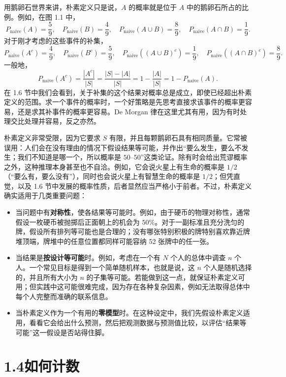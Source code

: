 \documentclass[UTF8,12pt,a4paper,fontset=fandol]{ctexart}
\begin{document}
用鹅卵石世界来讲，朴素定义只是说，$A$ 的概率就是位于 $A$ 中的鹅卵石所占的比例。例如，在图 1.1 中，
\[
  P_{\text{naive}}(A)=\frac59,\quad
  P_{\text{naive}}(B)=\frac49,\quad
  P_{\text{naive}}(A\cup B)=\frac89,\quad
  P_{\text{naive}}(A\cap B)=\frac19.
\]
对于刚才考虑的这些事件的补集，
\[
  P_{\text{naive}}(A^c)=\frac49,\quad
  P_{\text{naive}}(B^c)=\frac59,\quad
  P_{\text{naive}}((A\cup B)^c)=\frac19,\quad
  P_{\text{naive}}((A\cap B)^c)=\frac89.
\]
一般地，
\[
  P_{\text{naive}}(A^c)
  =\frac{|A^c|}{|S|}
  =\frac{|S|-|A|}{|S|}
  =1-\frac{|A|}{|S|}
  =1-P_{\text{naive}}(A).
\]
在 1.6 节中我们会看到，关于补集的这个结果对概率总是成立，即使已经超出朴素定义的范围。求一个事件的概率时，一个好策略是先思考直接求该事件的概率更容易，还是求其补事件的概率更容易。De Morgan 律在这里尤其有用，因为有时处理交比处理并容易，反之亦然。

朴素定义非常受限，因为它要求 $S$ 有限，并且每颗鹅卵石具有相同质量。它常被误用：人们会在没有理由的情况下假设结果等可能，并作出“要么发生，要么不发生；我们不知道是哪一个，所以概率是 $50$--$50$”这类论证。除有时会给出荒谬概率之外，这种推理本身甚至也不自洽。例如，它会说火星上有生命的概率是 $1/2$（“要么有，要么没有”），同时也会说火星上有智慧生命的概率是 $1/2$；但凭直觉，以及 1.6 节中发展的概率性质，后者显然应当严格小于前者。不过，朴素定义确实适用于几类重要问题：
\begin{itemize}
  \item 当问题中有\textbf{对称性}，使各结果等可能时。例如，由于硬币的物理对称性，通常假设一枚硬币被抛掷后正面朝上的机会为 $50\%$。对于一副标准且充分洗匀的牌，假设所有排列等可能也是合理的；没有哪张特别积极的牌特别喜欢靠近牌堆顶端，牌堆中的任意位置都同样可能容纳 52 张牌中的任一张。
  \item 当结果是\textbf{按设计等可能}时。例如，考虑在一个有 $N$ 个人的总体中调查 $n$ 个人。一个常见目标是得到一个简单随机样本，也就是说，这 $n$ 个人是随机选择的，并且所有大小为 $n$ 的子集等可能。若能做到这一点，就保证朴素定义可用；但实践中这可能很难完成，因为存在各种复杂因素，例如无法取得总体中每个人完整而准确的联系信息。
  \item 当朴素定义作为一个有用的\textbf{零模型}时。在这种设定中，我们先假设朴素定义适用，看看它会给出什么预测，然后把观测数据与预测值比较，以评估“结果等可能”这一假设是否站得住脚。
\end{itemize}

\section*{1.4\quad 如何计数}
\end{document}
